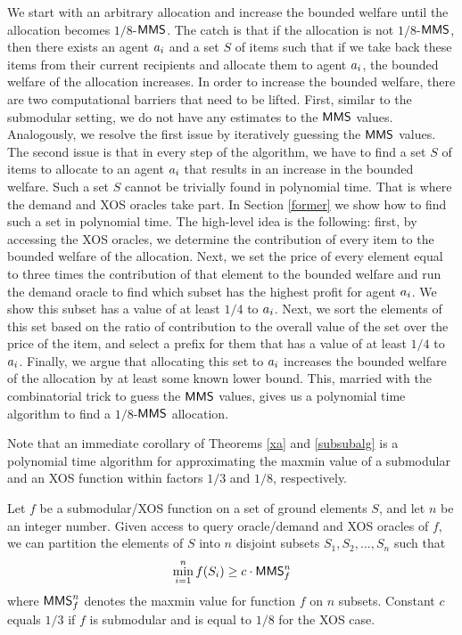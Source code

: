 We start with an arbitrary allocation and increase the bounded welfare until the allocation becomes $1/8$-$\mathsf{MMS}$. The catch is that if the allocation is not $1/8$-$\mathsf{MMS}$, then there exists an agent $a_i$ and a set $S$ of items such that if we take back these items from their current recipients and allocate them to agent $a_i$, the bounded welfare of the allocation increases. In order to increase the bounded welfare, there are two computational barriers that need to be lifted. First, similar to the submodular setting, we do not have any estimates to the $\mathsf{MMS}$ values. Analogously, we resolve the first issue by iteratively guessing the $\mathsf{MMS}$ values. The second issue is that in every step of the algorithm, we have to find a set $S$ of items to allocate to an agent $a_i$ that results in an increase in the bounded welfare. Such a set $S$ cannot be trivially found in polynomial time. That is where the demand and XOS oracles take part. In Section \ref{former} we show how to find such a set in polynomial time. The high-level idea is the following: first, by accessing the XOS oracles, we determine the contribution of every item to the bounded welfare of the allocation. Next, we set the price of every element equal to three times the contribution of that element to the bounded welfare and run the demand oracle to find which subset has the highest profit for agent $a_i$. We show this subset has a value of at least $1/4$ to $a_i$. Next, we sort the elements of this set based on the ratio of contribution to the overall value of the set over the price of the item, and select a prefix for them that has a value of at least $1/4$ to $a_i$. Finally, we argue that allocating this set to $a_i$ increases the bounded welfare of the allocation by at least some known lower bound. This, married with the combinatorial trick to guess the $\mathsf{MMS}$ values, gives us a polynomial time algorithm to find a $1/8$-$\mathsf{MMS}$ allocation.

Note that an immediate corollary of Theorems \ref{xa} and \ref{subsubalg} is a polynomial time algorithm for approximating the maxmin value of a submodular and an XOS function within factors $1/3$ and $1/8$, respectively. 
\begin{corollary}
Let $f$ be a submodular/XOS function on a set of ground elements $S$, and let $n$ be an integer number. Given access to query oracle/demand and XOS oracles of $f$, we can partition the elements of $S$ into $n$ disjoint subsets $S_1, S_2, \ldots, S_n$ such that 
$$\min_{i=1}^n f(S_i) \geq c\cdot\mathsf{MMS}_f^n$$
where $\mathsf{MMS}_f^n$ denotes the maxmin value for function $f$ on $n$ subsets. Constant $c$ equals $1/3$ if $f$ is submodular and is equal to $1/8$ for the XOS case.
\end{corollary}


